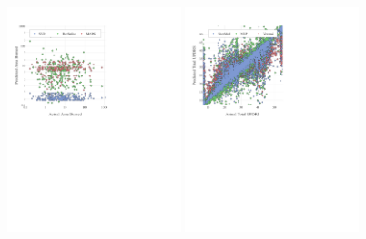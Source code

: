 \begin{figure}[h]
  \centering
  \includegraphics[width=0.45\textwidth,]{Figures/NA/scatter_forestfires.pdf}
  \hspace{.6cm}
  \includegraphics[width=0.45\textwidth,]{Figures/NA/scatter_parkinsons.pdf}
  \vspace{.6cm}


\end{figure}
